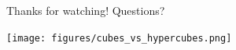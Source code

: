 \documentclass[10pt]{beamer}
\begin{document}




\begin{frame}
	Thanks for watching! Questions?
	\centering
	\begin{center}
		\texttt{[image: figures/cubes\_vs\_hypercubes.png]}
	\end{center}
\end{frame}
\end{document}
